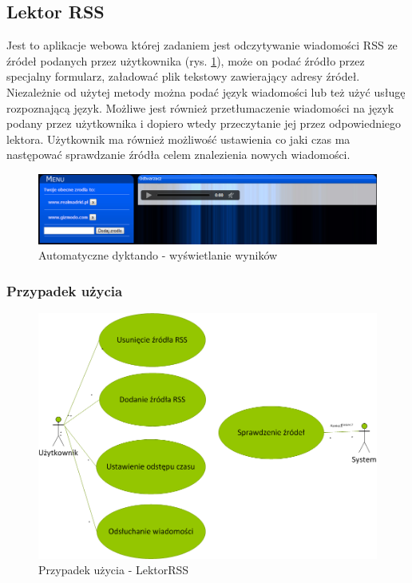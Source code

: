 \subsection{Lektor RSS}
Jest to aplikacje webowa której zadaniem jest odczytywanie wiadomości RSS ze źródeł podanych przez użytkownika (rys. \ref{fig:RssReaderScreen}), może on podać źródło przez specjalny formularz, załadować plik tekstowy zawierający adresy źródeł. Niezależnie od użytej metody można podać język wiadomości lub też użyć usługę rozpoznającą język. Możliwe jest również przetłumaczenie wiadomości na język podany przez użytkownika i dopiero wtedy przeczytanie jej przez odpowiedniego lektora. Użytkownik ma również możliwość ustawienia co jaki czas ma następować sprawdzanie źródła celem znalezienia nowych wiadomości.	 
\begin{figure}[!h]
	\centering
	\includegraphics[scale=0.45]{RssReaderScreen.png} 
	\caption{Automatyczne dyktando - wyświetlanie wyników} \label{fig:RssReaderScreen}
\end{figure}
\subsubsection{Przypadek użycia}
\begin{figure}[!h]
	\centering
	\includegraphics[scale=0.44]{useCaseRSS.png} 
	\caption{Przypadek użycia - LektorRSS}
\end{figure}

